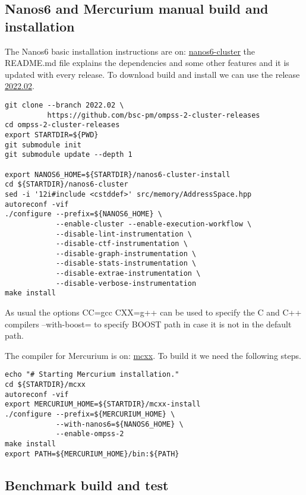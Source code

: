 \documentclass{article}
\begin{document}
\subsection{Nanos6 and Mercurium manual build and installation}\label{manuallib}

The Nanos6 basic installation instructions are on:
\href{https://github.com/bsc-pm/nanos6-cluster}{nanos6-cluster} the
README.md file explains the dependencies and some other features and
it is updated with every release. To download build and install we can
use the release
\href{https://github.com/bsc-pm/ompss-2-cluster-releases}{2022.02}.

\begin{lstlisting}
git clone --branch 2022.02 \
          https://github.com/bsc-pm/ompss-2-cluster-releases
cd ompss-2-cluster-releases
export STARTDIR=${PWD}
git submodule init
git submodule update --depth 1

export NANOS6_HOME=${STARTDIR}/nanos6-cluster-install
cd ${STARTDIR}/nanos6-cluster
sed -i '12i#include <cstddef>' src/memory/AddressSpace.hpp
autoreconf -vif
./configure --prefix=${NANOS6_HOME} \
            --enable-cluster --enable-execution-workflow \
            --disable-lint-instrumentation \
            --disable-ctf-instrumentation \
            --disable-graph-instrumentation \
            --disable-stats-instrumentation \
            --disable-extrae-instrumentation \
            --disable-verbose-instrumentation
make install
\end{lstlisting}

As usual the options CC=gcc CXX=g++ can be used to specify the C and
C++ compilers --with-boost= to specify BOOST path in case it is not in
the default path.

The compiler for Mercurium is on:
\href{https://github.com/bsc-pm/mcxx}{mcxx}. To build it we need the
following steps.

\begin{lstlisting}
echo "# Starting Mercurium installation."
cd ${STARTDIR}/mcxx
autoreconf -vif
export MERCURIUM_HOME=${STARTDIR}/mcxx-install
./configure --prefix=${MERCURIUM_HOME} \
            --with-nanos6=${NANOS6_HOME} \
            --enable-ompss-2
make install
export PATH=${MERCURIUM_HOME}/bin:${PATH}
\end{lstlisting}

\subsection{Benchmark build and test}\label{manualbench}
\end{document}
